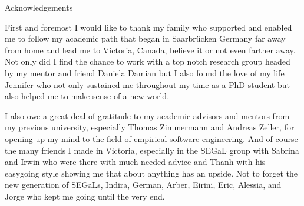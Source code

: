 \newpage
{}

\begin{center}
Acknowledgements
\end{center}

First and foremost I would like to thank my family who supported and enabled me to follow my academic path that began in Saarbr{\"u}cken Germany far away from home and lead me to Victoria, Canada, believe it or not even farther away.
%
Not only did I find the chance to work with a top notch research group headed by my mentor and friend Daniela Damian but I also found the love of my life Jennifer who not only sustained me throughout my time as a PhD student but also helped me to make sense of a new world.

I also owe a great deal of gratitude to my academic advisors and mentors from my previous university, especially Thomas Zimmermann and Andreas Zeller, for opening up my mind to the field of empirical software engineering.
%
And of course the many friends I made in Victoria, especially in the SEGaL group with Sabrina and Irwin who were there with much needed advice and Thanh with his easygoing style showing me that about anything has an upside.
Not to forget the new generation of SEGaLs, Indira, German, Arber, Eirini, Eric, Alessia, and Jorge who kept me going until the very end.




